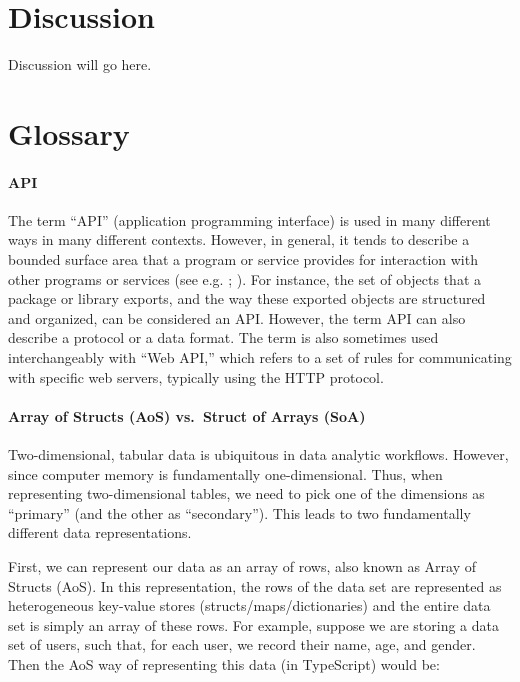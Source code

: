 \documentclass[
]{book}
\theoremstyle{definition}
\theoremstyle{definition}
\theoremstyle{definition}
\theoremstyle{definition}
\theoremstyle{remark}
\begin{document}
\chapter{Discussion}\label{discussion}

Discussion will go here.

\chapter{Glossary}\label{glossary}

\subsubsection{API}\label{API}

The term ``API'' (application programming interface) is used in many different ways in many different contexts. However, in general, it tends to describe a bounded surface area that a program or service provides for interaction with other programs or services (see e.g. ; ). For instance, the set of objects that a package or library exports, and the way these exported objects are structured and organized, can be considered an API. However, the term API can also describe a protocol or a data format. The term is also sometimes used interchangeably with ``Web API,'' which refers to a set of rules for communicating with specific web servers, typically using the HTTP protocol.

\subsubsection{Array of Structs (AoS) vs.~Struct of Arrays (SoA)}\label{SoA}

Two-dimensional, tabular data is ubiquitous in data analytic workflows. However, since computer memory is fundamentally one-dimensional. Thus, when representing two-dimensional tables, we need to pick one of the dimensions as ``primary'' (and the other as ``secondary''). This leads to two fundamentally different data representations.

First, we can represent our data as an array of rows, also known as Array of Structs (AoS). In this representation, the rows of the data set are represented as heterogeneous key-value stores (structs/maps/dictionaries) and the entire data set is simply an array of these rows. For example, suppose we are storing a data set of users, such that, for each user, we record their name, age, and gender. Then the AoS way of representing this data (in TypeScript) would be:
\end{document}
